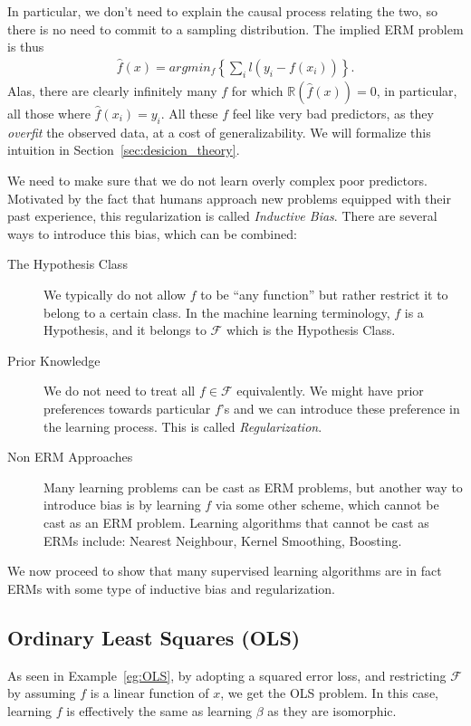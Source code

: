 \documentclass[12pt,a4paper]{article}
\theoremstyle{plain}
\theoremstyle{definition}
\newcommand{\loss}{l}
\newcommand{\riskn}{\mathbb{R}}
\newcommand{\argmin}[2]{argmin_{#1}\left\{ #2 \right\}}
\newcommand{\hyp}{f}
\newcommand{\hypclass}{\mathcal{F}}
\begin{document}
In particular, we don't need to explain the causal process relating the two, so there is no need to commit to a sampling distribution. The implied ERM problem is thus
\begin{align}
	\hat{\hyp}(x) = \argmin{\hyp}{\sum_i \loss(y_i - \hyp(x_i))}.
\end{align}
Alas, there are clearly infinitely many $\hyp$ for which $\riskn(\hat{\hyp}(x))=0$, in particular, all those where $\hat{\hyp}(x_i)=y_i$.
All these $\hyp$ feel like very bad predictors, as they \emph{overfit} the observed data, at a cost of generalizability.
We will formalize this intuition in Section~\ref{sec:desicion_theory}. 

We need to make sure that we do not learn overly complex poor predictors. 
Motivated by the fact that humans approach new problems equipped with their past experience, this regularization is called \emph{Inductive Bias}. 
There are several ways to introduce this bias, which can be combined:
\begin{description}
\item[The Hypothesis Class]
We typically do not allow $\hyp$ to be ``any function'' but rather restrict it to belong to a certain class. In the machine learning terminology, $\hyp$ is a Hypothesis, and it belongs to $\hypclass$ which is the Hypothesis Class.
\item[Prior Knowledge] We do not need to treat all $\hyp \in \hypclass$ equivalently. We might have prior preferences towards particular $\hyp$'s and we can introduce these preference in the learning process. This is called \emph{Regularization}.
\item[Non ERM Approaches] Many learning problems can be cast as ERM problems, but another way to introduce bias is by learning $\hyp$ via some other scheme, which cannot be cast as an ERM problem. 
Learning algorithms that cannot be cast as ERMs include: Nearest Neighbour, Kernel Smoothing, Boosting.
\end{description}



We now proceed to show that many supervised learning algorithms are in fact ERMs with some type of inductive bias and regularization.

\subsection{Ordinary Least Squares (OLS)}
\label{sec:ols}
As seen in Example~\ref{eg:OLS}, by adopting a squared error loss, and restricting $\hypclass$ by assuming $\hyp$ is a linear function of $x$, we get the OLS problem.
In this case, learning $\hyp$ is effectively the same as learning $\beta$ as they are isomorphic.
\end{document}
